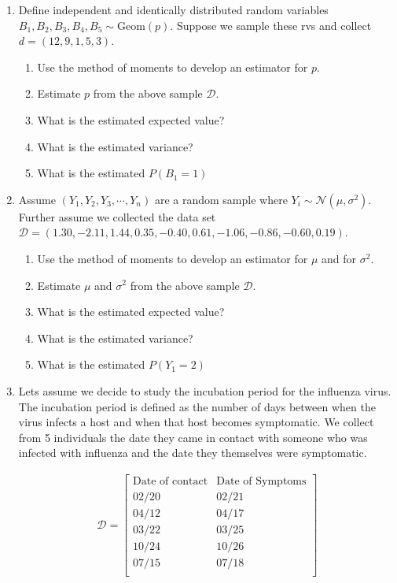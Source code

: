 \begin{enumerate}
    \item Define independent and identically distributed random variables $B_{1},B_{2},B_{3},B_{4},B_{5} \sim \text{Geom}(p)$. Suppose we sample these rvs and collect $d = (12,9,1,5,3)$.
    \begin{enumerate}
        \item Use the method of moments to develop an estimator for $p$.
        \item Estimate $p$ from the above sample $\mathcal{D}$. 
        \item What is the estimated expected value? 
        \item What is the estimated variance? 
        \item What is the estimated $P(B_{1} = 1)$
    \end{enumerate}
    \item Assume $(Y_{1}, Y_{2},Y_{3}, \cdots, Y_{n})$ are a random sample where $Y_{i} \sim \mathcal{N}(\mu,\sigma^{2})$. Further assume we collected the data set $\mathcal{D} = (1.30, -2.11, 1.44, 0.35, -0.40, 0.61,-1.06, -0.86, -0.60, 0.19)$.
    \begin{enumerate}
        \item Use the method of moments to develop an estimator for $\mu$ and for $\sigma^{2}$.
        \item Estimate $\mu$ and $\sigma^{2}$ from the above sample $\mathcal{D}$. 
        \item What is the estimated expected value? 
        \item What is the estimated variance? 
        \item What is the estimated $P(Y_{1} = 2)$
    \end{enumerate}
    \item Lets assume we decide to study the incubation period for the influenza virus. The incubation period is defined as the number of days between when the virus infects a host and when that host becomes symptomatic. We collect from 5 individuals the date they came in contact with someone who was infected with influenza and the date they themselves were symptomatic.
    
    \begin{align}
        \mathcal{D} 
        = \begin{bmatrix}
            \text{Date of contact} & \text{Date of Symptoms}\\
            02/20  & 02/21\\
            04/12  & 04/17\\
            03/22  & 03/25\\
            10/24  & 10/26\\
            07/15  & 07/18\\
          \end{bmatrix}
    \end{align}
    

\end{enumerate}
